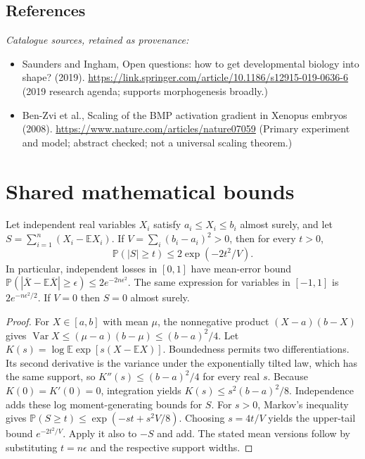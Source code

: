 \documentclass[11pt]{article}
\begin{document}
\subsection{References}
\noindent\emph{Catalogue sources, retained as provenance:}
\begin{itemize}
\item Saunders and Ingham, Open questions: how to get developmental biology into shape? (2019). \url{https://link.springer.com/article/10.1186/s12915-019-0636-6} (2019 research agenda; supports morphogenesis broadly.)
\item Ben-Zvi et al., Scaling of the BMP activation gradient in Xenopus embryos (2008). \url{https://www.nature.com/articles/nature07059} (Primary experiment and model; abstract checked; not a universal scaling theorem.)
\end{itemize}




\section{Shared mathematical bounds}\label{app:bounds}
\begin{lemma}\label{lem:bounded}
Let independent real variables $X_i$ satisfy $a_i\leq X_i\leq b_i$ almost surely,
and let $S=\sum_{i=1}^n(X_i-\mathbb{E} X_i)$. If
$V=\sum_i(b_i-a_i)^2>0$, then for every $t>0$,
\[
 \mathbb{P}(|S|\geq t)\leq 2\exp(-2t^2/V).
\]
In particular, independent losses in $[0,1]$ have mean-error bound
$\mathbb{P}(|\overline X-\mathbb{E}\overline X|\geq\epsilon)
\leq2e^{-2n\epsilon^2}$. The same expression for variables in $[-1,1]$
is $2e^{-n\epsilon^2/2}$. If $V=0$ then $S=0$ almost surely.
\end{lemma}
\begin{proof}
For $X\in[a,b]$ with mean $\mu$, the nonnegative product
$(X-a)(b-X)$ gives
$\operatorname{Var} X\leq(\mu-a)(b-\mu)\leq(b-a)^2/4$.
Let $K(s)=\log\mathbb{E}\exp[s(X-\mathbb{E} X)]$.
Boundedness permits two differentiations. Its second derivative is the variance
under the exponentially tilted law, which has the same support, so
$K''(s)\leq(b-a)^2/4$ for every real $s$.
Because $K(0)=K'(0)=0$, integration yields
$K(s)\leq s^2(b-a)^2/8$.
Independence adds these log moment-generating bounds for $S$.
For $s>0$, Markov's inequality gives
$\mathbb{P}(S\geq t)\leq\exp(-st+s^2V/8)$.
Choosing $s=4t/V$ yields the upper-tail bound $e^{-2t^2/V}$.
Apply it also to $-S$ and add. The stated mean versions follow by substituting
$t=n\epsilon$ and the respective support widths.
\end{proof}
\end{document}

